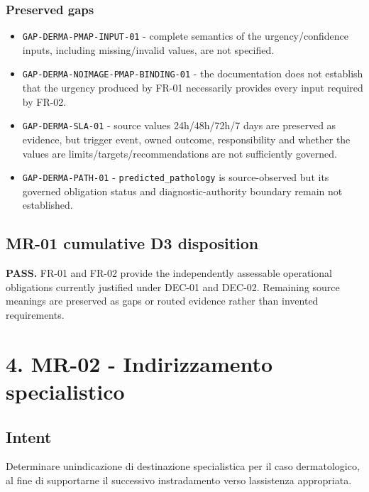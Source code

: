 \documentclass[11pt,a4paper]{article}
\providecommand{\tightlist}{\setlength{\itemsep}{0pt}\setlength{\parskip}{0pt}}
\begin{document}
\subsubsection{Preserved gaps}\label{preserved-gaps}

\begin{itemize}
\tightlist
\item
  \texttt{GAP-DERMA-PMAP-INPUT-01} - complete semantics of the
  urgency/confidence inputs, including missing/invalid values, are not
  specified.
\item
  \texttt{GAP-DERMA-NOIMAGE-PMAP-BINDING-01} - the documentation does
  not establish that the urgency produced by FR-01 necessarily provides
  every input required by FR-02.
\item
  \texttt{GAP-DERMA-SLA-01} - source values 24h/48h/72h/7 days are
  preserved as evidence, but trigger event, owned outcome,
  responsibility and whether the values are
  limits/targets/recommendations are not sufficiently governed.
\item
  \texttt{GAP-DERMA-PATH-01} - \texttt{predicted\_pathology} is
  source-observed but its governed obligation status and
  diagnostic-authority boundary remain not established.
\end{itemize}

\subsection{MR-01 cumulative D3
disposition}\label{mr-01-cumulative-d3-disposition}

\textbf{PASS.} FR-01 and FR-02 provide the independently assessable
operational obligations currently justified under DEC-01 and DEC-02.
Remaining source meanings are preserved as gaps or routed evidence
rather than invented requirements.

\section{4. MR-02 - Indirizzamento
specialistico}\label{4-mr-02---indirizzamento-specialistico}

\subsection{Intent}\label{intent-1}

Determinare un\textquotesingle indicazione di destinazione specialistica
per il caso dermatologico, al fine di supportarne il successivo
instradamento verso l\textquotesingle assistenza appropriata.
\end{document}
